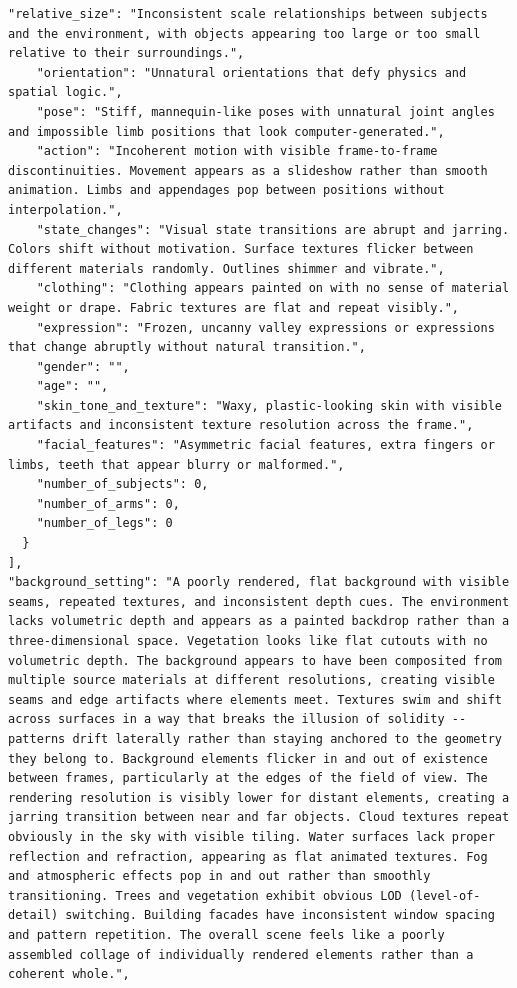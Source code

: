 \documentclass{llmxive}
\begin{document}
\begin{tcolorbox}
\begin{Verbatim}[breaklines=true,breakanywhere=true,fontsize=\scriptsize]
    "relative_size": "Inconsistent scale relationships between subjects and the environment, with objects appearing too large or too small relative to their surroundings.",
    "orientation": "Unnatural orientations that defy physics and spatial logic.",
    "pose": "Stiff, mannequin-like poses with unnatural joint angles and impossible limb positions that look computer-generated.",
    "action": "Incoherent motion with visible frame-to-frame discontinuities. Movement appears as a slideshow rather than smooth animation. Limbs and appendages pop between positions without interpolation.",
    "state_changes": "Visual state transitions are abrupt and jarring. Colors shift without motivation. Surface textures flicker between different materials randomly. Outlines shimmer and vibrate.",
    "clothing": "Clothing appears painted on with no sense of material weight or drape. Fabric textures are flat and repeat visibly.",
    "expression": "Frozen, uncanny valley expressions or expressions that change abruptly without natural transition.",
    "gender": "",
    "age": "",
    "skin_tone_and_texture": "Waxy, plastic-looking skin with visible artifacts and inconsistent texture resolution across the frame.",
    "facial_features": "Asymmetric facial features, extra fingers or limbs, teeth that appear blurry or malformed.",
    "number_of_subjects": 0,
    "number_of_arms": 0,
    "number_of_legs": 0
  }
],
"background_setting": "A poorly rendered, flat background with visible seams, repeated textures, and inconsistent depth cues. The environment lacks volumetric depth and appears as a painted backdrop rather than a three-dimensional space. Vegetation looks like flat cutouts with no volumetric depth. The background appears to have been composited from multiple source materials at different resolutions, creating visible seams and edge artifacts where elements meet. Textures swim and shift across surfaces in a way that breaks the illusion of solidity -- patterns drift laterally rather than staying anchored to the geometry they belong to. Background elements flicker in and out of existence between frames, particularly at the edges of the field of view. The rendering resolution is visibly lower for distant elements, creating a jarring transition between near and far objects. Cloud textures repeat obviously in the sky with visible tiling. Water surfaces lack proper reflection and refraction, appearing as flat animated textures. Fog and atmospheric effects pop in and out rather than smoothly transitioning. Trees and vegetation exhibit obvious LOD (level-of-detail) switching. Building facades have inconsistent window spacing and pattern repetition. The overall scene feels like a poorly assembled collage of individually rendered elements rather than a coherent whole.",

\end{Verbatim}
\end{tcolorbox}
\end{document}

